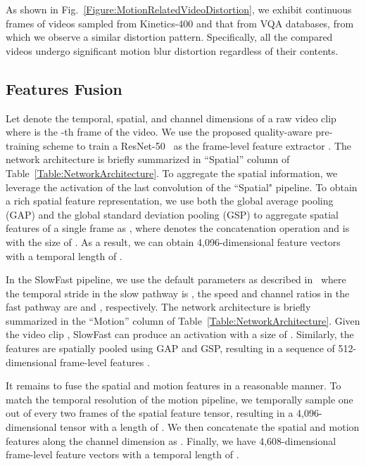 \documentclass[journal]{IEEEtran}
\begin{document}
As shown in Fig.~\ref{Figure:MotionRelatedVideoDistortion}, we exhibit continuous frames of videos sampled from Kinetics-400 and that from VQA databases, from which we observe a similar distortion pattern. Specifically, all the compared videos undergo significant motion blur distortion regardless of their contents.

\subsection{Features Fusion}\label{subsection:FeaturesFusion}
Let  denote the temporal, spatial, and channel dimensions of a raw video clip  where  is the -th frame of the video. We use the proposed quality-aware pre-training scheme to train a ResNet-50~\cite{he2016deep} as the frame-level feature extractor . The network architecture is briefly summarized in ``Spatial'' column of Table~\ref{Table:NetworkArchitecture}. To aggregate the spatial information, we leverage the activation of the last convolution of the ``Spatial" pipeline. To obtain a rich spatial feature representation, we use both the global average pooling (GAP) and the global standard deviation pooling (GSP) to aggregate spatial features of a single frame as , where  denotes the concatenation operation and  is with the size of . As a result, we can obtain 4,096-dimensional feature vectors with a temporal length of .

In the SlowFast pipeline, we use the default parameters as described in~\cite{feichtenhofer2019slowfast} where the temporal stride in the slow pathway is , the speed and channel ratios in the fast pathway are  and , respectively. The network architecture is briefly summarized in the ``Motion'' column of Table~\ref{Table:NetworkArchitecture}. Given the video clip , SlowFast can produce an activation with a size of . Similarly, the features are spatially pooled using GAP and GSP, resulting in a sequence of 512-dimensional frame-level features .

It remains to fuse the spatial and motion features in a reasonable manner. To match the temporal resolution of the motion pipeline, we temporally sample one out of every two frames of the spatial feature tensor, resulting in a 4,096-dimensional tensor with a length of . We then concatenate the spatial and motion features along the channel dimension as . Finally, we have 4,608-dimensional frame-level feature vectors with a temporal length of .

\newcommand{\blockc}[4]{\multirow{#4}{*}{-.1em] \text{13, #1}\#3}
}
\end{document}
